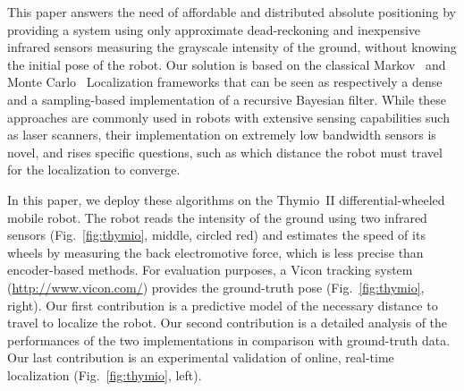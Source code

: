 \documentclass{svmult}
\newcommand{\fig}[1]{Fig.~\ref{fig:#1}}
\begin{document}
This paper answers the need of affordable and distributed absolute positioning by providing a system using only approximate dead-reckoning and inexpensive infrared sensors measuring the grayscale intensity of the ground, without knowing the initial pose of the robot.
Our solution is based on the classical Markov~\cite{fox1999markov} and Monte Carlo~\cite{dellaert1999monte} Localization frameworks that can be seen as respectively a dense and a sampling-based implementation of a recursive Bayesian filter.
While these approaches are commonly used in robots with extensive sensing capabilities such as laser scanners, their implementation on extremely low bandwidth sensors is novel, and rises specific questions, such as which distance the robot must travel for the localization to converge.

In this paper, we deploy these algorithms on the Thymio~II differential-wheeled mobile robot.
The robot reads the intensity of the ground using two infrared sensors (\fig{thymio}, middle, circled red) and estimates the speed of its wheels by measuring the back electromotive force, which is less precise than encoder-based methods.
For evaluation purposes, a Vicon tracking system (\url{http://www.vicon.com/}) provides the ground-truth pose (\fig{thymio}, right).
Our first contribution is a predictive model of the necessary distance to travel to localize the robot.
Our second contribution is a detailed analysis of the performances of the two implementations in comparison with ground-truth data.
Our last contribution is an experimental validation of online, real-time localization (\fig{thymio}, left).
\end{document}
